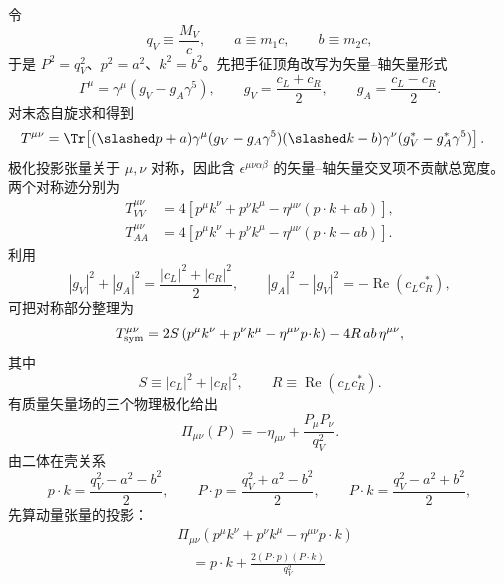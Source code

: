 \begin{derivation}[有质量费米子末态的矢量衰变宽度]
令
\begin{equation*}
 q_V\equiv\frac{M_V}{c},\qquad a\equiv m_1c,\qquad b\equiv m_2c,
\end{equation*}
于是 $P^2=q_V^2$、$p^2=a^2$、$k^2=b^2$。先把手征顶角改写为矢量--轴矢量形式
\begin{equation*}
 \Gamma^\mu
 =\gamma^\mu(g_V-g_A\gamma^5),\qquad
 g_V=\frac{c_L+c_R}{2},\qquad
 g_A=\frac{c_L-c_R}{2}.
\end{equation*}
对末态自旋求和得到
\begin{align*}
 T^{\mu\nu}
 &=\Tr\!\left[(\slashed p+a)\gamma^\mu(g_V-g_A\gamma^5)
 (\slashed k-b)\gamma^\nu(g_V^*-g_A^*\gamma^5)\right].
\end{align*}
极化投影张量关于 $\mu,\nu$ 对称，因此含 $\epsilon^{\mu\nu\alpha\beta}$ 的矢量--轴矢量交叉项不贡献总宽度。两个对称迹分别为
\begin{align*}
 T_{VV}^{\mu\nu}
 &=4\left[p^\mu k^\nu+p^\nu k^\mu
 -\eta^{\mu\nu}(p\!\cdot\!k+ab)\right],\\
 T_{AA}^{\mu\nu}
 &=4\left[p^\mu k^\nu+p^\nu k^\mu
 -\eta^{\mu\nu}(p\!\cdot\!k-ab)\right].
\end{align*}
利用
\begin{equation*}
 |g_V|^2+|g_A|^2=\frac{|c_L|^2+|c_R|^2}{2},\qquad
 |g_A|^2-|g_V|^2=-\operatorname{Re}(c_Lc_R^*),
\end{equation*}
可把对称部分整理为
\begin{equation*}
 T_{\rm sym}^{\mu\nu}
 =2S\left(p^\mu k^\nu+p^\nu k^\mu-\eta^{\mu\nu}p\!\cdot\!k\right)
 -4R\,ab\,\eta^{\mu\nu},
\end{equation*}
其中
\begin{equation*}
 S\equiv|c_L|^2+|c_R|^2,\qquad
 R\equiv\operatorname{Re}(c_Lc_R^*).
\end{equation*}
有质量矢量场的三个物理极化给出
\begin{equation*}
 \Pi_{\mu\nu}(P)
 =-\eta_{\mu\nu}+\frac{P_\mu P_\nu}{q_V^2}.
\end{equation*}
由二体在壳关系
\begin{equation*}
 p\!\cdot\!k=\frac{q_V^2-a^2-b^2}{2},\qquad
 P\!\cdot\!p=\frac{q_V^2+a^2-b^2}{2},\qquad
 P\!\cdot\!k=\frac{q_V^2-a^2+b^2}{2},
\end{equation*}
先算动量张量的投影：
\begin{align*}
 &\Pi_{\mu\nu}
 \left(p^\mu k^\nu+p^\nu k^\mu-\eta^{\mu\nu}p\!\cdot\!k\right)\\
 &\quad=p\!\cdot\!k
 +\frac{2(P\!\cdot\!p)(P\!\cdot\!k)}{q_V^2}\\

\end{align*}
\end{derivation}

